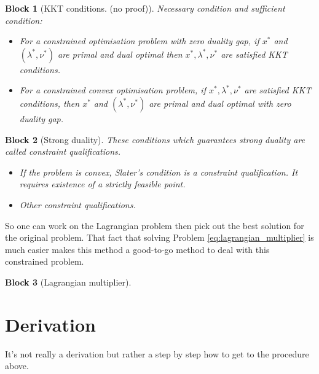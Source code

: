 \documentclass[11pt,a4paper]{article}
\theoremstyle{plain}
\newtheorem{block}{Block}[section]
\theoremstyle{definition}
\theoremstyle{remark}
\begin{document}
\begin{block}[KKT conditions. (no proof)] 
    Necessary condition and sufficient condition:
    \begin{itemize}
        \item For a constrained optimisation problem with zero duality gap, if $x^{*}$ and $(\lambda^{*}, \nu^{*})$ are primal and dual optimal then $x^{*}, \lambda^{*}, \nu^{*}$ are satisfied KKT conditions.
        \item For a constrained convex optimisation problem, if $x^{*}, \lambda^{*}, \nu^{*}$ are satisfied KKT conditions, then $x^{*}$ and $(\lambda^{*}, \nu^{*})$ are primal and dual optimal with zero duality gap.
    \end{itemize}
\end{block}
\begin{block}[Strong duality]
    These conditions which guarantees strong duality are called constraint qualifications.
    \begin{itemize}
        \item If the problem is convex, Slater's condition is a constraint qualification. It requires existence of a strictly feasible point.
        \item Other constraint qualifications.
    \end{itemize}
\end{block}

 So one can work on the Lagrangian problem then pick out the best solution for the original problem. That fact that solving Problem \eqref{eq:lagrangian_multiplier} is much easier makes this method a good-to-go method to deal with this constrained problem.

\begin{block}[Lagrangian multiplier]
     
\end{block}

\section{Derivation}%
\label{sec:derivation}
It's not really a derivation but rather a step by step how to get to the procedure above.
\end{document}
